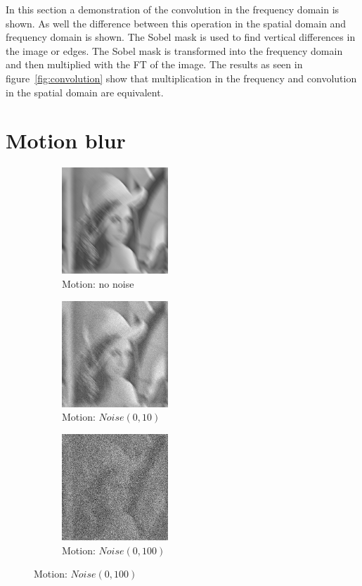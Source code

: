 \documentclass[letterpaper]{article}
\begin{document}
In this section a demonstration of the convolution in the frequency domain is shown. As well the difference between this operation in the spatial domain and frequency domain is shown. The Sobel mask is used to find vertical differences in the image or edges. The Sobel mask is transformed into the frequency domain and then multiplied with the FT of the image. The results as seen in figure~\ref{fig:convolution} show that multiplication in the frequency and convolution in the spatial domain are equivalent.
\section{Motion blur}
\begin{figure}[hbtp]
  \centering
  \begin{subfigure}{4cm}
    \includegraphics[width=4cm]{images/lenna_blur_0015.png}
    \caption{Motion: no noise}
  \end{subfigure}
  \begin{subfigure}{4cm}
    \includegraphics[width=4cm]{images/lenna_blur_10.png}
    \caption{Motion: $Noise(0,10)$}
  \end{subfigure}
  \begin{subfigure}{4cm}
    \includegraphics[width=4cm]{images/lenna_blur_100.png}
    \caption{Motion: $Noise(0,100)$}

\end{subfigure}
\end{figure}
\end{document}

